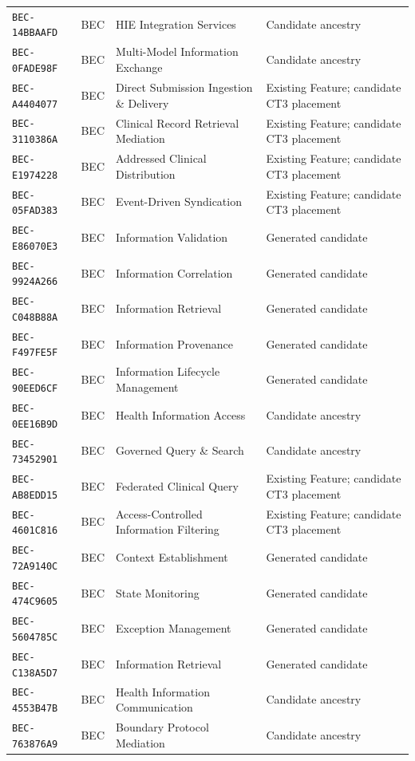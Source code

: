 \documentclass[11pt,a4paper,openany]{book}
\begin{document}
\begin{longtable}{@{}p{.19\linewidth}p{.12\linewidth}p{.39\linewidth}p{.24\linewidth}@{}}
\texttt{BEC-14BBAAFD} & BEC & HIE Integration Services & Candidate ancestry \\
\texttt{BEC-0FADE98F} & BEC & Multi-Model Information Exchange & Candidate ancestry \\
\texttt{BEC-A4404077} & BEC & Direct Submission Ingestion \& Delivery & Existing Feature; candidate CT3 placement \\
\texttt{BEC-3110386A} & BEC & Clinical Record Retrieval Mediation & Existing Feature; candidate CT3 placement \\
\texttt{BEC-E1974228} & BEC & Addressed Clinical Distribution & Existing Feature; candidate CT3 placement \\
\texttt{BEC-05FAD383} & BEC & Event-Driven Syndication & Existing Feature; candidate CT3 placement \\
\texttt{BEC-E86070E3} & BEC & Information Validation & Generated candidate \\
\texttt{BEC-9924A266} & BEC & Information Correlation & Generated candidate \\
\texttt{BEC-C048B88A} & BEC & Information Retrieval & Generated candidate \\
\texttt{BEC-F497FE5F} & BEC & Information Provenance & Generated candidate \\
\texttt{BEC-90EED6CF} & BEC & Information Lifecycle Management & Generated candidate \\
\texttt{BEC-0EE16B9D} & BEC & Health Information Access & Candidate ancestry \\
\texttt{BEC-73452901} & BEC & Governed Query \& Search & Candidate ancestry \\
\texttt{BEC-AB8EDD15} & BEC & Federated Clinical Query & Existing Feature; candidate CT3 placement \\
\texttt{BEC-4601C816} & BEC & Access-Controlled Information Filtering & Existing Feature; candidate CT3 placement \\
\texttt{BEC-72A9140C} & BEC & Context Establishment & Generated candidate \\
\texttt{BEC-474C9605} & BEC & State Monitoring & Generated candidate \\
\texttt{BEC-5604785C} & BEC & Exception Management & Generated candidate \\
\texttt{BEC-C138A5D7} & BEC & Information Retrieval & Generated candidate \\
\texttt{BEC-4553B47B} & BEC & Health Information Communication & Candidate ancestry \\
\texttt{BEC-763876A9} & BEC & Boundary Protocol Mediation & Candidate ancestry \\

\end{longtable}
\end{document}
